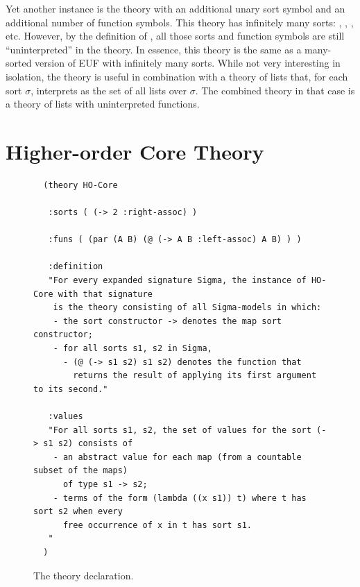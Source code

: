 Yet another instance is the theory with an additional unary sort symbol 
and an additional number of function symbols.
This theory has infinitely many sorts:
, ,  , etc.
However, by the definition of ,
all those sorts and function symbols are still ``uninterpreted'' in the theory.
In essence, 
this theory is the same as a many-sorted version of EUF with infinitely many sorts.
While not very interesting in isolation,
the theory is useful in combination with a theory of lists that,
for each sort $\sigma$, 
interprets  as the set of all lists over $\sigma$.
The combined theory in that case is a theory of lists with uninterpreted
functions.

\section{Higher-order Core Theory}
\label{sec:ho-core}

\begin{figure}[t]
  \small
  {\color{NavyBlue}
  \begin{verbatim}
  (theory HO-Core
  
   :sorts ( (-> 2 :right-assoc) )
  
   :funs ( (par (A B) (@ (-> A B :left-assoc) A B) ) )
  
   :definition
   "For every expanded signature Sigma, the instance of HO-Core with that signature
    is the theory consisting of all Sigma-models in which: 
    - the sort constructor -> denotes the map sort constructor;
    - for all sorts s1, s2 in Sigma, 
      - (@ (-> s1 s2) s1 s2) denotes the function that
        returns the result of applying its first argument to its second."
    
   :values 
   "For all sorts s1, s2, the set of values for the sort (-> s1 s2) consists of
    - an abstract value for each map (from a countable subset of the maps)
      of type s1 -> s2;
    - terms of the form (lambda ((x s1)) t) where t has sort s2 when every
      free occurrence of x in t has sort s1.
   " 
  )
  \end{verbatim}
  }%
  \caption{The  theory declaration.}
  \label{fig:HO-Core}
  \end{figure}
  

